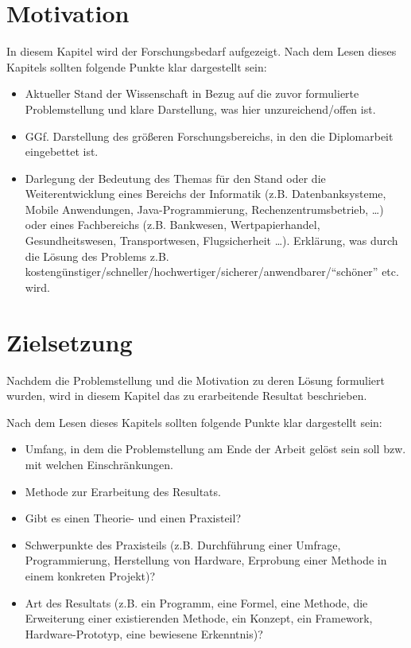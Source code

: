 \section{Motivation}

In diesem Kapitel wird der Forschungsbedarf aufgezeigt. Nach dem Lesen dieses Kapitels sollten folgende Punkte klar dargestellt sein:
\begin{itemize}
	\item Aktueller Stand der Wissenschaft in Bezug auf die zuvor formulierte Problemstellung und klare Darstellung, was hier unzureichend/offen ist. 
	\item GGf. Darstellung des größeren Forschungsbereichs, in den die Diplomarbeit eingebettet ist.
	\item Darlegung der Bedeutung des Themas für den Stand oder die Weiterentwicklung eines Bereichs der Informatik (z.B. Datenbanksysteme, Mobile Anwendungen, Java-Programmierung, Rechenzentrumsbetrieb, \dots) oder eines Fachbereichs (z.B. Bankwesen, Wertpapierhandel, Gesundheitswesen, Transportwesen, Flugsicherheit \dots). Erklärung, was durch die Lösung des Problems z.B. kostengünstiger/schneller/hochwertiger/sicherer/anwendbarer/\enquote{schöner} etc. wird.
\end{itemize}

\section{Zielsetzung}

Nachdem die Problemstellung und die Motivation zu deren Lösung formuliert wurden, wird in diesem Kapitel das zu erarbeitende Resultat beschrieben.

Nach dem Lesen dieses Kapitels sollten folgende Punkte klar dargestellt sein:
\begin{itemize}
	\item Umfang, in dem die Problemstellung am Ende der Arbeit gelöst sein soll bzw. mit welchen Einschränkungen.
	\item Methode zur Erarbeitung des Resultats.
	\item Gibt es einen Theorie- und einen Praxisteil?
	\item Schwerpunkte des Praxisteils (z.B. Durchführung einer Umfrage, Programmierung, Herstellung von Hardware, Erprobung einer Methode in einem konkreten Projekt)?
	\item Art des Resultats (z.B. ein Programm, eine Formel, eine Methode, die Erweiterung einer existierenden Methode, ein Konzept, ein Framework, Hardware-Prototyp, eine bewiesene Erkenntnis)?
\end{itemize}

